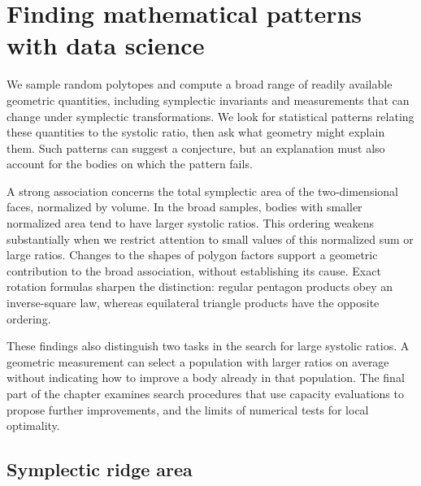 \section{Finding mathematical patterns with data science}
\label{sec:fresh-data-search}
\label{sec:black-box-datascience}

We sample random polytopes and compute a broad range of readily available
geometric quantities, including symplectic invariants and measurements
that can change under symplectic transformations. We look for statistical
patterns relating these quantities to the systolic ratio, then ask what
geometry might explain them. Such patterns can suggest a conjecture, but
an explanation must also account for the bodies on which the pattern fails.

A strong association concerns the total symplectic area of the
two-dimensional faces, normalized by volume. In the broad samples,
bodies with smaller normalized area tend to have larger systolic ratios.
This ordering weakens substantially when we restrict attention to small
values of this normalized sum or large ratios. Changes to the shapes of polygon factors
support a geometric contribution to the broad association, without
establishing its cause. Exact rotation formulas sharpen the distinction:
regular pentagon products obey an inverse-square law, whereas equilateral
triangle products have the opposite ordering.

These findings also distinguish two tasks in the search for large systolic
ratios. A geometric measurement can select a population with larger ratios
on average without indicating how to improve a body already in that
population. The final part of the chapter examines search procedures that
use capacity evaluations to propose further improvements, and the limits
of numerical tests for local optimality.

\subsection{Symplectic ridge area}
\label{subsec:ds-sampling}

